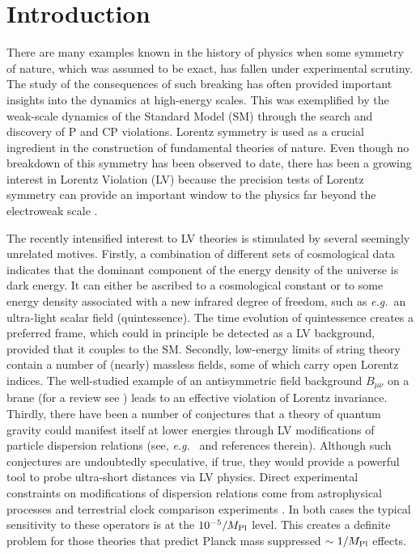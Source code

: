 \documentclass[12pt]{revtex4}
\begin{document}
\begin{titlepage}
\end{titlepage}


\newpage

\setcounter{footnote}{0}
\setcounter{equation}{0}


\section{Introduction}
\label{Intro}


There are many examples known in the history of physics when some
symmetry of nature, which was assumed to be exact, has fallen under
experimental scrutiny. The study of the consequences of such breaking
has often provided important insights into the dynamics at
high-energy scales. This was exemplified by the weak-scale dynamics of
the Standard Model (SM) through the search and discovery of P and CP 
violations. Lorentz symmetry is used as a crucial ingredient in the
construction of fundamental theories of nature. Even though no
breakdown of this symmetry has been observed to date, there has been a
growing interest in Lorentz Violation (LV) because the precision 
tests of Lorentz symmetry can provide an important window to the
physics far beyond the electroweak scale
\cite{Kost1,CG,Jacobsonreview,PhysToday,Sigl:2004cq,Mattingly:2005re}. 


The recently intensified interest to LV theories is stimulated by
several seemingly unrelated motives. Firstly, a combination of different sets of 
cosmological data indicates that the dominant component of the energy
density of the universe is dark energy. It can either be ascribed
to a cosmological constant or to some energy density associated with a
new infrared degree of freedom, such as {\em e.g.}\ an ultra-light
scalar field (quintessence). The time evolution of quintessence
creates a preferred frame, which could in principle be detected as a
LV background, provided that it couples to the SM. Secondly, low-energy
limits of string theory contain a number of (nearly) massless fields,
some of which carry open Lorentz indices. The well-studied 
example of an antisymmetric field background $B_{\mu\nu}$ on a brane
(for a review see \cite{DN}) leads to an effective violation of Lorentz
invariance. Thirdly, there have been a number of conjectures that a
theory of quantum gravity could manifest itself at lower energies
through LV modifications of particle dispersion relations 
(see, {\em e.g.}\ \cite{lcq,Vucetich:2005ra} and references
therein). Although such 
conjectures are undoubtedly speculative, if true, they would provide a
powerful tool to probe ultra-short distances via LV physics.  Direct
experimental constraints on modifications of dispersion relations come
from astrophysical processes \cite{CFJ,AmC,Ted1,GK,Kost2,Sarkar} and
terrestrial clock comparison experiments \cite{clock1,clock2,Vuc,MP:}. 
In both cases the typical sensitivity to these operators is at the
$10^{-5}/M_{\rm Pl}$ level. This creates a definite problem for those
theories that predict Planck mass suppressed $\sim 1/M_{\rm Pl}$
effects. 
\end{document}
